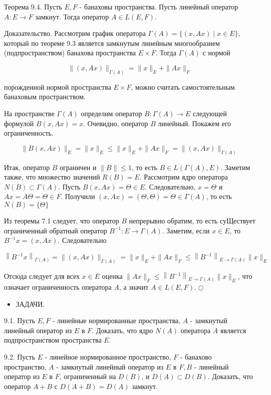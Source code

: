 Теорема 9.4. Пусть $E, F$ - банаховы пространства. Пусть линейный оператор $A: E \rightarrow F$ замкнут. Тогда оператор $A \in L(E, F)$.

Доказательство. Рассмотрим график оператора $\Gamma(A)=\{(x, A x) \mid x \in E\}$, который по теореме 9.3 является замкнутым линейным многообразием (подпространством) банахова пространства $E \times F$. Тогда $\Gamma(A)$ с нормой

\[
\|(x, A x)\|_{\Gamma(A)}=\|x\|_{E}+\|A x\|_{F}
\]

порожденной нормой пространства $E \times F$, можно считать самостоятельным банаховым пространством.

На пространстве $\Gamma(A)$ определим оператор $B: \Gamma(A) \rightarrow E$ следующей формулой $B(x, A x)=x$. Очевидно, оператор $B$ линейный. Покажем его ограниченность.

\[
\|B(x, A x)\|_{E}=\|x\|_{E} \leq\|x\|_{E}+\|A x\|_{F}=\|(x, A x)\|_{\Gamma(A)}
\]

Итак, оператор $B$ ограничен и $\|B\| \leq 1$, то есть $B \in L(\Gamma(A), E)$. Заметим также, что множество значений $R(B)=E$. Рассмотрим ядро оператора $N(B) \subset \Gamma(A)$. Пусть $B(x, A x)=\Theta \in E$. Следовательно, $x=\Theta$ и $A x=A \Theta=\Theta \in F$. Получили $(x, A x)=(\Theta, \Theta)=\Theta \in \Gamma(A)$, то есть $N(B)=\{\Theta\}$

Из теоремы 7.1 следует, что оператор $B$ непрерывно обратим, то есть суЩествует ограниченный обратный оператор $B^{-1}: E \rightarrow \Gamma(A)$. Заметим, если $x \in E$, то $B^{-1} x=(x, A x)$. Следовательно

\[
\left\|B^{-1} x\right\|_{\Gamma(A)}=\|(x, A x)\|_{\Gamma(A)}=\|x\|_{E}+\|A x\|_{F} \leq\left\|B^{-1}\right\|_{E \rightarrow \Gamma(A)}\|x\|_{E}
\]

Отсюда следует для всех $x \in E$ оценка $\|A x\|_{F} \leq\left\|B^{-1}\right\|_{E \rightarrow \Gamma(A)}\|x\|_{E}$, что означает ограниченность оператора $A$, а значит $A \in L(E, F) . \bigcirc$

\begin{itemize}
  \item ЗАДАЧИ.
\end{itemize}

9.1. Пусть $E, F$ - линейные нормированные пространства, $A$ - замкнутый линейный оператор из $E$ в $F$. Доказать, что ядро $N(A)$ оператора $A$ является подпространством пространства $E$.

9.2. Пусть $E$ - линейное нормированное пространство, $F$ - банахово пространство, $A$ - замкнутый линейный оператор из $E$ в $F, B$ - линейный оператор из $E$ в $F$, ограниченный на $D(B)$, и $D(A) \subset D(B)$. Доказать, что оператор $A+B$ с $D(A+B)=D(A)$ замкнут.

